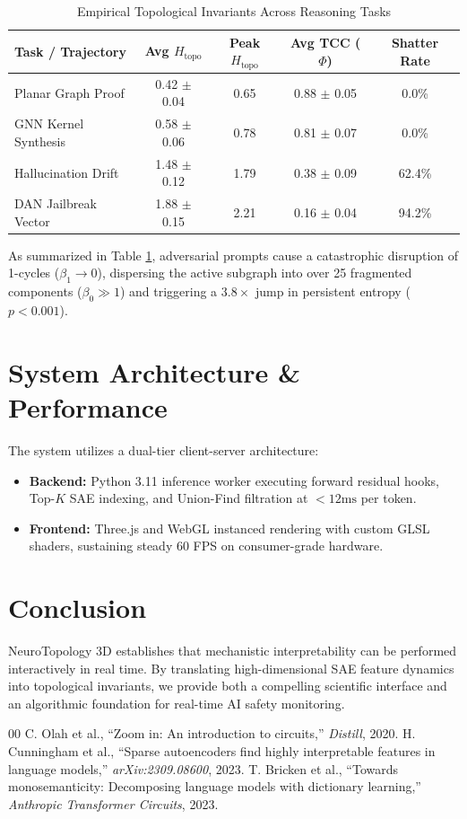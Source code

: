 \documentclass[10pt,journal,compsoc]{IEEEtran}
\begin{document}
\begin{table}[htbp]
\caption{Empirical Topological Invariants Across Reasoning Tasks}
\label{tab:benchmarks}
\centering
\begin{tabular}{lcccc}
\toprule
\textbf{Task / Trajectory} & \textbf{Avg $H_{\text{topo}}$} & \textbf{Peak $H_{\text{topo}}$} & \textbf{Avg TCC ($\Phi$)} & \textbf{Shatter Rate} \\
\midrule
Planar Graph Proof & 0.42 $\pm$ 0.04 & 0.65 & 0.88 $\pm$ 0.05 & 0.0\% \\
GNN Kernel Synthesis & 0.58 $\pm$ 0.06 & 0.78 & 0.81 $\pm$ 0.07 & 0.0\% \\
Hallucination Drift & 1.48 $\pm$ 0.12 & 1.79 & 0.38 $\pm$ 0.09 & 62.4\% \\
DAN Jailbreak Vector & 1.88 $\pm$ 0.15 & 2.21 & 0.16 $\pm$ 0.04 & 94.2\% \\
\bottomrule
\end{tabular}
\end{table}

As summarized in Table \ref{tab:benchmarks}, adversarial prompts cause a catastrophic disruption of 1-cycles ($\beta_1 \to 0$), dispersing the active subgraph into over 25 fragmented components ($\beta_0 \gg 1$) and triggering a $3.8\times$ jump in persistent entropy ($p < 0.001$).

\section{System Architecture \& Performance}
The system utilizes a dual-tier client-server architecture:
\begin{itemize}
    \item \textbf{Backend:} Python 3.11 inference worker executing forward residual hooks, Top-$K$ SAE indexing, and Union-Find filtration at $<12\text{ms}$ per token.
    \item \textbf{Frontend:} Three.js and WebGL instanced rendering with custom GLSL shaders, sustaining steady 60 FPS on consumer-grade hardware.
\end{itemize}

\section{Conclusion}
NeuroTopology 3D establishes that mechanistic interpretability can be performed interactively in real time. By translating high-dimensional SAE feature dynamics into topological invariants, we provide both a compelling scientific interface and an algorithmic foundation for real-time AI safety monitoring.


\begin{thebibliography}{00}
 C. Olah et al., ``Zoom in: An introduction to circuits,'' \textit{Distill}, 2020.
 H. Cunningham et al., ``Sparse autoencoders find highly interpretable features in language models,'' \textit{arXiv:2309.08600}, 2023.
 T. Bricken et al., ``Towards monosemanticity: Decomposing language models with dictionary learning,'' \textit{Anthropic Transformer Circuits}, 2023.
\end{thebibliography}
\end{document}
